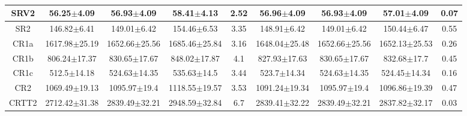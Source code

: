 \documentclass[12pt]{paper}
\begin{document}
\begin{table}[ht]
\begin{center}
{\begin{tabular}{c|ccc|c|ccc|c}
SRV2 & 56.25$\pm$4.09 & 56.93$\pm$4.09 & 58.41$\pm$4.13 & 2.52 & 56.96$\pm$4.09 & 56.93$\pm$4.09 & 57.01$\pm$4.09 & 0.07\\ 
\hline
SR2 & 146.82$\pm$6.41 & 149.01$\pm$6.42 & 154.46$\pm$6.53 & 3.35 & 148.91$\pm$6.42 & 149.01$\pm$6.42 & 150.44$\pm$6.47 & 0.55\\ 
\hline
\hline
CR1a & 1617.98$\pm$25.19 & 1652.66$\pm$25.56 & 1685.46$\pm$25.84 & 3.16 & 1648.04$\pm$25.48 & 1652.66$\pm$25.56 & 1652.13$\pm$25.53 & 0.26\\ 
CR1b & 806.24$\pm$17.37 & 830.65$\pm$17.67 & 848.02$\pm$17.87 & 4.1 & 827.93$\pm$17.63 & 830.65$\pm$17.67 & 832.68$\pm$17.7 & 0.45\\ 
CR1c & 512.5$\pm$14.18 & 524.63$\pm$14.35 & 535.63$\pm$14.5 & 3.44 & 523.7$\pm$14.34 & 524.63$\pm$14.35 & 524.45$\pm$14.34 & 0.16\\ 
CR2 & 1069.49$\pm$19.13 & 1095.97$\pm$19.4 & 1118.55$\pm$19.57 & 3.53 & 1091.24$\pm$19.34 & 1095.97$\pm$19.4 & 1096.86$\pm$19.39 & 0.47\\ 
CRTT2 & 2712.42$\pm$31.38 & 2839.49$\pm$32.21 & 2948.59$\pm$32.84 & 6.7 & 2839.41$\pm$32.22 & 2839.49$\pm$32.21 & 2837.82$\pm$32.17 & 0.03\\ 

\end{tabular}}
\end{center}\caption*{}\end{table}
\end{document}
